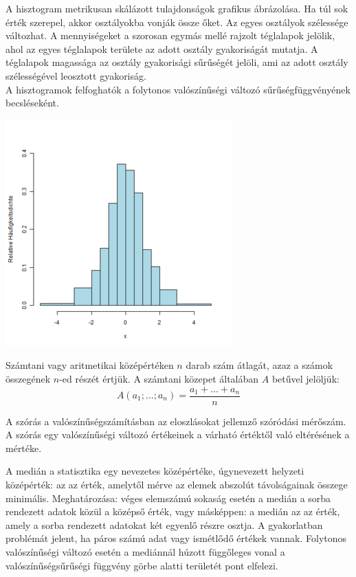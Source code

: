 \documentclass[11pt,a4paper]{article}
\begin{document}
\begin{tcolorbox}[colback=MidnightBlue!5!white,colframe=MidnightBlue!60!black,title= Hisztogram]
    \begin{multicols*}{2}
        A hisztogram metrikusan skálázott tulajdonságok grafikus ábrázolása. Ha túl sok érték szerepel, akkor osztályokba vonják össze őket. Az egyes osztályok szélessége változhat. A mennyiségeket a szorosan egymás mellé rajzolt téglalapok jelölik, ahol az egyes téglalapok területe az adott osztály gyakoriságát mutatja. A téglalapok magassága az osztály gyakorisági sűrűségét jelöli, ami az adott osztály szélességével leosztott gyakoriság.\\
        A hisztogramok felfoghatók a folytonos valószínűségi változó sűrűségfüggvényének becsléseként.
        \columnbreak
            \begin{center}
                \includegraphics*[width=.35\textwidth]{hisztogram.png}
            \end{center}
        \end{multicols*}
\end{tcolorbox}

\begin{tcolorbox}[colback=MidnightBlue!5!white,colframe=MidnightBlue!60!black,title= Átlag]
    Számtani vagy aritmetikai középértéken $n$ darab szám átlagát, azaz a számok összegének $n$-ed részét értjük. A számtani közepet általában $A$ betűvel jelöljük:
    $$A(a_{1};...;a_{n})={\frac {a_{1}+...+a_{n}}{n}}$$
\end{tcolorbox}

\begin{tcolorbox}[colback=MidnightBlue!5!white,colframe=MidnightBlue!60!black,title= Szórás]
    A szórás a valószínűségszámításban az eloszlásokat jellemző szóródási mérőszám. A szórás egy valószínűségi változó értékeinek a várható értéktől való eltérésének a mértéke.
\end{tcolorbox}

\begin{tcolorbox}[colback=MidnightBlue!5!white,colframe=MidnightBlue!60!black,title= Medián]
    A medián a statisztika egy nevezetes középértéke, úgynevezett helyzeti középérték: az az érték, amelytől mérve az elemek abszolút távolságainak összege minimális. Meghatározása: véges elemszámú sokaság esetén a medián a sorba rendezett adatok közül a középső érték, vagy másképpen: a medián az az érték, amely a sorba rendezett adatokat két egyenlő részre osztja. A gyakorlatban problémát jelent, ha páros számú adat vagy ismétlődő értékek vannak. Folytonos valószínűségi változó esetén a mediánnál húzott függőleges vonal a valószínűségsűrűségi függvény görbe alatti területét pont elfelezi.
\end{tcolorbox}
\end{document}
